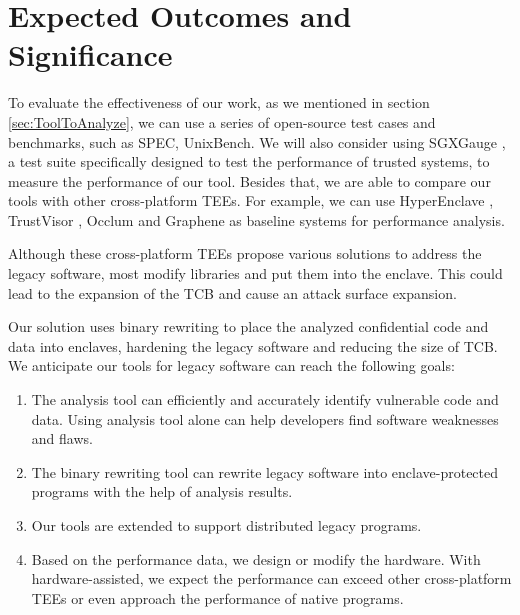 \section{Expected Outcomes and Significance}
To evaluate the effectiveness of our work, as we mentioned in section
\ref{sec:ToolToAnalyze}, we can use a series of open-source test cases and benchmarks,
such as SPEC, UnixBench. 
We will also consider using SGXGauge \cite{Kumar2022ACB}, a test suite specifically
designed to test the performance of trusted systems, to measure the performance
of our tool.
Besides that, we are able to compare our tools with other cross-platform TEEs.
For example, we can use HyperEnclave \cite{Jia2022HyperEnclaveAO}, TrustVisor
\cite{McCune2010TrustVisorET}, Occlum \cite{Shen2020OcclumSA} and Graphene
\cite{Tsai2017GrapheneSGXAP} as baseline systems for performance analysis.

Although these cross-platform TEEs propose various solutions to address the
legacy software, most modify libraries and put them into the enclave.
This could lead to the expansion of the TCB and cause  an attack surface expansion.

Our solution uses binary rewriting to place the analyzed confidential code and data
into enclaves, hardening the legacy software and reducing the size of TCB.
We anticipate our tools for legacy software can reach the following goals:
\begin{enumerate}
    \item The analysis tool can efficiently and accurately identify vulnerable code and data.
    Using analysis tool alone can help developers find software weaknesses and flaws.
    \item The binary rewriting tool can rewrite legacy software into enclave-protected programs
    with the help of analysis results.
    \item Our tools are extended to support distributed legacy programs.
    \item Based on the performance data, we design or modify the hardware.
    With hardware-assisted, we expect the performance can exceed other cross-platform TEEs
    or even approach the performance of native programs.
\end{enumerate}